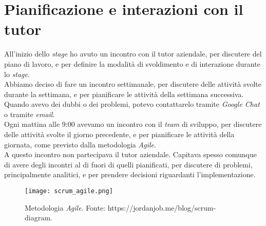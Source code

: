 \section{Pianificazione e interazioni con il tutor}
All'inizio dello \textit{stage} ho avuto un incontro con il tutor aziendale, per discutere del piano di lavoro, e per definire la modalità
di svoldimento e di interazione durante lo \textit{stage}.\\
Abbiamo deciso di fare un incontro settimanale, per discutere delle attività svolte durante la settimana, e per pianificare le attività
della settimana successiva.\\
Quando avevo dei dubbi o dei problemi, potevo contattarelo tramite \textit{Google Chat} o tramite \textit{email}.\\
Ogni mattina alle 9:00 avevamo un incontro con il \textit{team} di sviluppo, per discutere delle attività svolte il giorno precedente, e per
pianificare le attività della giornata, come previsto dalla metodologia \textit{Agile}.\\
A questo incontro non partecipava il tutor aziendale. 
Capitava spesso comunque di avere degli incontri al di fuori di quelli pianificati, per discutere di problemi, principalmente analitici, 
e per prendere decisioni riguardanti l'implementazione.\\

\begin{figure}[h] 
  \centering 
  \texttt{[image: scrum\_agile.png]} 
  \caption{Metodologia \textit{Agile}. Fonte: https://jordanjob.me/blog/scrum-diagram. }
  \label{fig:scrum_agile}
\end{figure}